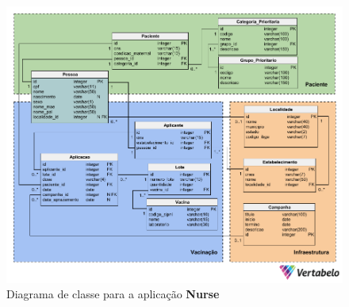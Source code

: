 \begin{figure}[!ht]
  \centering
  \includegraphics[width=\textwidth]{figuras/cap4/4_4_1_diagrama_classes.png}
  \caption{Diagrama de classe para a aplicação \textbf{Nurse}}
  \label{fig:diagrama_classes}
\end{figure}

